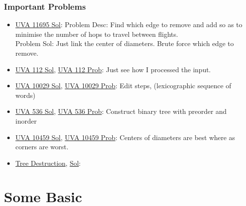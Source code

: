 \documentclass[8pt, a4paper, oneside, twocolumn]{extarticle}
\begin{document}
\subsubsection{Important Problems}
\begin{itemize}
	\item \href {https://gist.github.com/sourabh2311/6cff69fef833097556696bd6f31f3f1d}{UVA 11695 Sol}: Problem Desc: Find which edge to remove and add so as to minimise the number of hops to travel between flights.\\
	Problem Sol: Just link the center of diameters. Brute force which edge to remove. 
	\item \href {https://github.com/sourabh2311/Competitive-Programming/blob/master/UVA_112.cpp}{UVA 112 Sol}, \href {https://uva.onlinejudge.org/external/1/112.pdf}{UVA 112 Prob}: Just see how I processed the input.	
	\item \href {https://gist.github.com/sourabh2311/6b761c14bef4e5887e6b03b809bc4983}{UVA 10029 Sol}, \href {https://uva.onlinejudge.org/external/100/10029.pdf}{UVA 10029 Prob}: Edit steps, (lexicographic sequence of words)	
	\item \href {https://gist.github.com/sourabh2311/d73572fab5cf6d390f509d29abf4cd60}{UVA 536 Sol}, \href {https://uva.onlinejudge.org/external/5/536.pdf}{UVA 536 Prob}: Construct binary tree with preorder and inorder	
	\item \href {https://gist.github.com/sourabh2311/25edb7a7067948832ade9192bd2635ce}{UVA 10459 Sol}, \href {https://uva.onlinejudge.org/external/104/10459.pdf}{UVA 10459 Prob}: Centers of diameters are best where as corners are worst.	
    \item \href {https://codeforces.com/contest/911/problem/F}{Tree Destruction}, \href {https://codeforces.com/contest/911/submission/34122817}{Sol}:
\end{itemize}
\section{Some Basic}
\end{document}
